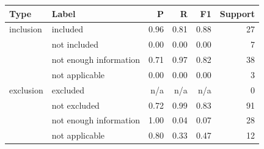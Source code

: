 \begin{tabular}{llrrrr}\toprule
Type & Label & P & R & F1 & Support \\ \midrule
inclusion & included & 0.96 & 0.81 & 0.88 & 27 \\
 & not included & 0.00 & 0.00 & 0.00 & 7 \\
 & not enough information & 0.71 & 0.97 & 0.82 & 38 \\
 & not applicable & 0.00 & 0.00 & 0.00 & 3 \\
\midrule
exclusion & excluded & n/a & n/a & n/a & 0 \\
 & not excluded & 0.72 & 0.99 & 0.83 & 91 \\
 & not enough information & 1.00 & 0.04 & 0.07 & 28 \\
 & not applicable & 0.80 & 0.33 & 0.47 & 12 \\
\bottomrule\end{tabular}